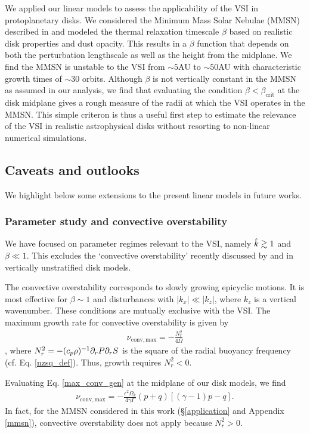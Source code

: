 
We applied our linear models to assess the applicability of the VSI in
protoplanetary disks. We considered the Minimum Mass Solar Nebulae
(MMSN) described in \cite{chiang10} and   
modeled the thermal relaxation timescale $\beta$ based on realistic
disk properties and dust opacity. This results in a $\beta$ function that
depends on both the perturbation lengthscale as well as the height 
from the midplane. We find the MMSN is unstable to the VSI 
from $\sim 5$AU to $\sim50$AU with characteristic growth times of
$\sim 30$ orbits. Although $\beta$ is not vertically constant in the
MMSN as assumed in our analysis, we find that evaluating the condition
$\beta <\beta_\mathrm{crit}$ at the disk midplane gives a rough measure of the
radii at which the VSI operates in the MMSN. This simple criteron is
thus a useful first step to estimate the relevance of the VSI in
realistic astrophysical disks without resorting to non-linear
numerical simulations.  

\subsection{Caveats and outlooks} 
We highlight below some extensions to the present  
linear models in future works.  

\subsubsection{Parameter study and convective overstability}
We have focused on parameter regimes relevant to the VSI,
namely $\hat{k}\gtrsim 1$ and $\beta\ll 1$. This excludes the
`convective overstability' recently discussed by \cite{klahr14} and
\cite{lyra14} in vertically unstratified disk models. 

The convective overstability corresponds to slowly growing epicyclic motions.
It is most effective for $\beta\sim 1$ and disturbances with $|k_x|\ll |k_z|$, where
$k_z$ is a vertical wavenumber. These conditions are mutually exclusive with the VSI. 
The maximum growth rate for convective overstability is given by 
\begin{align}
  \nu_\mathrm{conv,max} = -\frac{N^2_r}{4\Omega}\label{max_conv_gen}
\end{align}
\citep{lyra14}, where $N_r^2 = -(c_p\rho)^{-1}\partial_rP\partial_rS$ is the
square of the radial buoyancy frequency
(cf. Eq. \ref{nzsq_def}). Thus, growth requires $N_r^2<0$.  

Evaluating Eq. \ref{max_conv_gen} at the midplane of our disk models,
we find  
\begin{align}
  \nu_\mathrm{conv,max} =
  -\frac{\epsilon^2\Omega_k}{4\gamma\Gamma}\left(p+q\right)
  \left[\left(\gamma-1\right)p-q\right]. \label{max_conv}
\end{align}
In fact, for the MMSN considered in this work (\S\ref{application} and Appendix
\ref{mmsn}), convective overstability does not apply because
$N_r^2>0$.   

